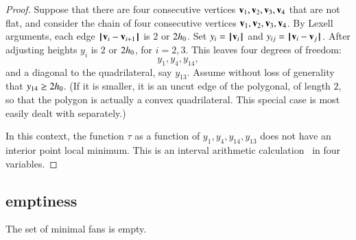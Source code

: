 \begin{proof} 
Suppose that there are four consecutive vertices ${\mathbf v}_1,{\mathbf v}_2,{\mathbf v}_3,{\mathbf v}_4$ that are not flat, and consider the chain of four consecutive vertices ${\mathbf v}_1,{\mathbf v}_2,{\mathbf v}_3,{\mathbf v}_4$. By Lexell arguments, each edge ${\hskip0.1em|\hskip-0.15em|\hskip0.1em}{\mathbf v}_i - {\mathbf v}_{i+1}{\hskip0.1em|\hskip-0.15em|\hskip0.1em}$ is $2$ or $2{h_0}$. Set $y_i = {{\hskip0.1em|\hskip-0.15em|\hskip0.1em}{\mathbf v}_i{\hskip0.1em|\hskip-0.15em|\hskip0.1em}}$ and $y_{ij} = {\hskip0.1em|\hskip-0.15em|\hskip0.1em}{\mathbf v}_i - {\mathbf v}_j{\hskip0.1em|\hskip-0.15em|\hskip0.1em}$. After adjusting heights $y_i$ is $2$ or $2{h_0}$, for $i=2,3$. This leaves four degrees of freedom:
$$
y_1,y_4,y_{14},
$$
and a diagonal to the quadrilateral, say $y_{13}$. Assume without loss of generality that  $y_{14}\ge 2{h_0}$.  (If it is smaller, it is an uncut edge of the polygonal, of length $2$, so that the polygon is actually a convex quadrilateral.  This special case is most easily dealt with separately.)

In this context, the function $\tau$ as a function of $y_1,y_4,y_{14},y_{13}$ does not have an interior point local minimum.
This is an interval arithmetic calculation~\cite[cc:qua]{hales:2009:nonlinear} in four variables.%
\end{proof}


\subsection{emptiness}

\begin{lemma}\label{lemma:min-empty}  
The set of minimal fans is empty.
\end{lemma}


